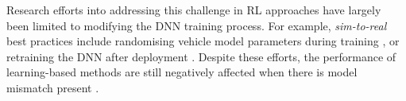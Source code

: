 Research efforts into addressing this challenge in RL approaches have largely been limited to modifying the DNN training process.
For example, \emph{sim-to-real} best practices include randomising vehicle model parameters during training \cite{Ivanov2020}, or retraining the DNN after deployment \cite{Zhou2020}.
Despite these efforts, the performance of learning-based methods are still negatively affected when there is model mismatch present \cite{hsu2022}.








